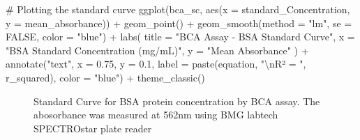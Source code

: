 \documentclass[
  letterpaper,
  DIV=11,
  numbers=noendperiod]{scrreprt}
\newenvironment{Shaded}{\begin{snugshade}}{\end{snugshade}}
\newcommand{\AttributeTok}[1]{\textcolor[rgb]{0.40,0.45,0.13}{#1}}
\newcommand{\CommentTok}[1]{\textcolor[rgb]{0.37,0.37,0.37}{#1}}
\newcommand{\ConstantTok}[1]{\textcolor[rgb]{0.56,0.35,0.01}{#1}}
\newcommand{\FloatTok}[1]{\textcolor[rgb]{0.68,0.00,0.00}{#1}}
\newcommand{\FunctionTok}[1]{\textcolor[rgb]{0.28,0.35,0.67}{#1}}
\newcommand{\NormalTok}[1]{\textcolor[rgb]{0.00,0.23,0.31}{#1}}
\newcommand{\SpecialCharTok}[1]{\textcolor[rgb]{0.37,0.37,0.37}{#1}}
\newcommand{\StringTok}[1]{\textcolor[rgb]{0.13,0.47,0.30}{#1}}
\begin{document}
\begin{Shaded}
\begin{Highlighting}[]
\CommentTok{\# Plotting the standard curve}
\FunctionTok{ggplot}\NormalTok{(bca\_sc, }\FunctionTok{aes}\NormalTok{(}\AttributeTok{x =}\NormalTok{ standard\_Concentration, }\AttributeTok{y =}\NormalTok{ mean\_absorbance)) }\SpecialCharTok{+}
  \FunctionTok{geom\_point}\NormalTok{() }\SpecialCharTok{+}
  \FunctionTok{geom\_smooth}\NormalTok{(}\AttributeTok{method =} \StringTok{"lm"}\NormalTok{, }\AttributeTok{se =} \ConstantTok{FALSE}\NormalTok{, }\AttributeTok{color =} \StringTok{"blue"}\NormalTok{) }\SpecialCharTok{+}
  \FunctionTok{labs}\NormalTok{(}
    \AttributeTok{title =} \StringTok{"BCA Assay {-} BSA Standard Curve"}\NormalTok{,}
    \AttributeTok{x =} \StringTok{"BSA Standard Concentration (mg/mL)"}\NormalTok{,}
    \AttributeTok{y =} \StringTok{"Mean Absorbance"}
\NormalTok{  ) }\SpecialCharTok{+}
  \FunctionTok{annotate}\NormalTok{(}\StringTok{"text"}\NormalTok{, }\AttributeTok{x =} \FloatTok{0.75}\NormalTok{, }\AttributeTok{y =} \FloatTok{0.1}\NormalTok{, }\AttributeTok{label =} \FunctionTok{paste}\NormalTok{(equation, }\StringTok{"}\SpecialCharTok{\textbackslash{}n}\StringTok{R² = "}\NormalTok{, r\_squared), }\AttributeTok{color =} \StringTok{"blue"}\NormalTok{) }\SpecialCharTok{+}
  \FunctionTok{theme\_classic}\NormalTok{()}
\end{Highlighting}
\end{Shaded}

\begin{figure}[H]


\caption{\label{fig-bca-stdcurve}Standard Curve for BSA protein
concentration by BCA assay. The abosorbance was measured at 562nm using
BMG labtech SPECTROstar plate reader}

\end{figure}%
\end{document}
